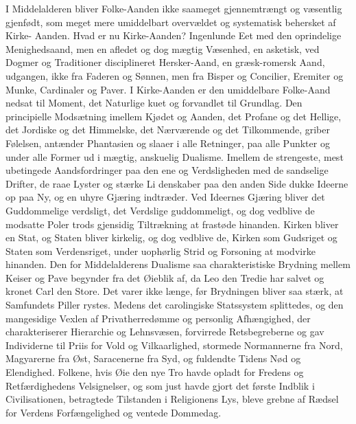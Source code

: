 \documentclass[12pt]{book}
\newcommand{\opage}[1]{\marginnote{\footnotesize\textit{[#1]}}}
\begin{document}
I Middelalderen bliver Folke-Aanden ikke saameget
gjennemtrængt og væsentlig gjenfødt, som meget mere
umiddelbart overvældet og systematisk behersket af Kirke-%
Aanden. Hvad er nu Kirke-Aanden? Ingenlunde Eet
med den oprindelige Menighedsaand, men en afledet og
dog mægtig Væsenhed, en asketisk, ved Dogmer og Traditioner
disciplineret Hersker-Aand, en græsk-romersk
Aand, udgangen, ikke fra Faderen og Sønnen, men fra
Bisper og Concilier, Eremiter og Munke, Cardinaler og
Paver. I Kirke-Aanden er den umiddelbare Folke-Aand
nedsat til Moment, det Naturlige kuet og forvandlet til
Grundlag. Den principielle Modsætning imellem Kjødet
og Aanden, det Profane og det Hellige, det Jordiske og
det Himmelske, det Nærværende og det Tilkommende,
griber Følelsen, antænder Phantasien og slaaer i alle Retninger,
paa alle Punkter og under alle Former ud i
mægtig, anskuelig Dualisme. Imellem de strengeste, mest
ubetingede Aandsfordringer paa den ene og Verdsligheden
med de sandselige Drifter, de raae Lyster og stærke Li\-%
\opage{28}\setcounter{footnote}{0}%
denskaber paa den anden Side dukke Ideerne op paa Ny,
og en uhyre Gjæring indtræder. Ved Ideernes Gjæring
bliver det Guddommelige verdsligt, det Verdslige guddommeligt,
og dog vedblive de modsatte Poler trods
gjensidig Tiltrækning at frastøde hinanden. Kirken bliver
en Stat, og Staten bliver kirkelig, og dog vedblive de,
Kirken som Gudsriget og Staten som Verdensriget,
under uophørlig Strid og Forsoning at modvirke hinanden.
Den for Middelalderens Dualisme saa charakteristiske
Brydning mellem Keiser og Pave begynder fra det
Øieblik af, da Leo den Tredie har salvet og kronet Carl
den Store. Det varer ikke længe, før Brydningen bliver
saa stærk, at Samfundets Piller rystes. Medens det
carolingiske Statssystem splittedes, og den mangesidige
Vexlen af Privatherredømme og personlig Afhængighed,
der charakteriserer Hierarchie og Lehnsvæsen, forvirrede
Retsbegreberne og gav Individerne til Priis for Vold og
Vilkaarlighed, stormede Normannerne fra Nord, Magyarerne
fra Øst, Saracenerne fra Syd, og fuldendte Tidens
Nød og Elendighed. Folkene, hvis Øie den nye Tro
havde opladt for Fredens og Retfærdighedens Velsignelser,
og som just havde gjort det første Indblik i Civilisationen,
betragtede Tilstanden i Religionens Lys, bleve grebne af
Rædsel for Verdens Forfængelighed og ventede Dommedag.
\end{document}
